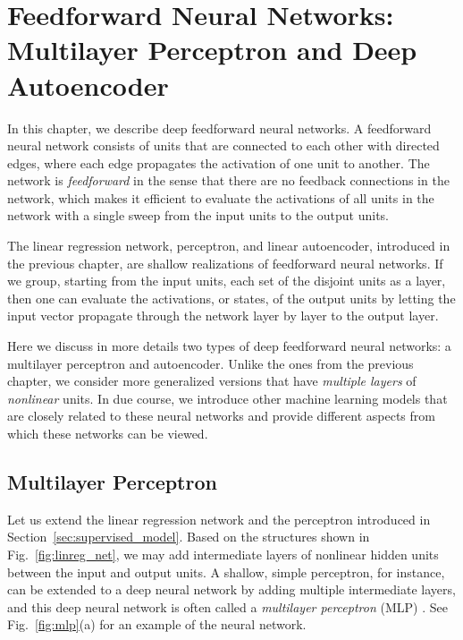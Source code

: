 \documentclass[dissertation,nocontribution]{aaltoseries}
\begin{document}
\chapter{Feedforward Neural Networks: \\{\small Multilayer
Perceptron and Deep Autoencoder}}
\label{chap:ffnn}

In this chapter, we describe deep feedforward neural
networks. A feedforward neural network consists of units
that are connected to each other with directed edges, where
each edge propagates the activation of one unit to another.
The network is \textit{feedforward} in the sense that there
are no feedback connections in the network, which makes it
efficient to evaluate the activations of all units in the
network with a single sweep from the input units to the
output units.

The linear regression network, perceptron, and linear
autoencoder, introduced in the previous chapter, are shallow
realizations of feedforward neural networks.  If we group,
starting from the input units, each set of the disjoint
units as a layer, then one can evaluate the activations, or
states, of the output units by letting the input vector
propagate through the network layer by layer to the output
layer.

Here we discuss in more details two types of deep
feedforward neural networks: a multilayer
perceptron and autoencoder. Unlike the ones from the
previous chapter, we consider more generalized versions that
have \textit{multiple layers} of \textit{nonlinear} units.
In due course, we introduce other machine learning models
that are closely related to these neural networks and
provide different aspects from which these networks can be
viewed.

\section{Multilayer Perceptron}
\label{sec:mlp}

Let us extend the linear regression network and
the perceptron introduced in
Section~\ref{sec:supervised_model}.  Based on the structures
shown in Fig.~\ref{fig:linreg_net}, we may add intermediate
layers of nonlinear hidden units between the input and
output units. A shallow, simple perceptron, for instance,
can be extended to a deep neural network by adding multiple
intermediate layers, and this deep neural network is often
called a \textit{multilayer perceptron}
(MLP)
\citep{Rosenblatt1962}. See Fig.~\ref{fig:mlp}(a) for an
example of the neural network.
\end{document}
